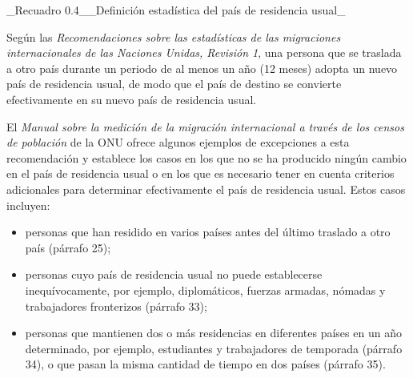 \documentclass[
]{book}
\providecommand{\tightlist}{%
  \setlength{\itemsep}{0pt}\setlength{\parskip}{0pt}}
\begin{document}
\_Recuadro 0.4\_\_Definición estadística del país de residencia usual\_

Según las \emph{Recomendaciones sobre las estadísticas de las migraciones internacionales de las Naciones Unidas, Revisión 1}, una persona que se traslada a otro país durante un periodo de al menos un año (12 meses) adopta un nuevo país de residencia usual, de modo que el país de destino se convierte efectivamente en su nuevo país de residencia usual.

El \emph{Manual sobre la medición de la migración internacional a través de los censos de población} de la ONU ofrece algunos ejemplos de excepciones a esta recomendación y establece los casos en los que no se ha producido ningún cambio en el país de residencia usual o en los que es necesario tener en cuenta criterios adicionales para determinar efectivamente el país de residencia usual. Estos casos incluyen:

\begin{itemize}
\tightlist
\item
  personas que han residido en varios países antes del último traslado a otro país (párrafo 25);
\item
  personas cuyo país de residencia usual no puede establecerse inequívocamente, por ejemplo, diplomáticos, fuerzas armadas, nómadas y trabajadores fronterizos (párrafo 33);
\item
  personas que mantienen dos o más residencias en diferentes países en un año determinado, por ejemplo, estudiantes y trabajadores de temporada (párrafo 34), o que pasan la misma cantidad de tiempo en dos países (párrafo 35).
\end{itemize}
\end{document}
